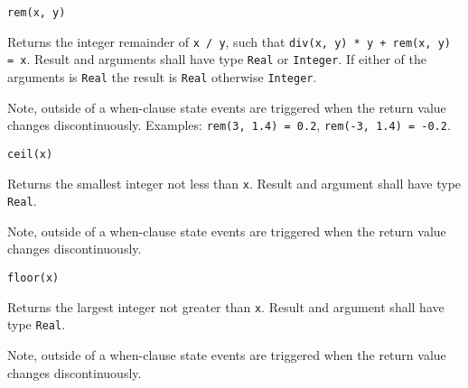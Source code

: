 \begin{operatordefinition}[rem]
\begin{synopsis}\begin{lstlisting}
rem(x, y)
\end{lstlisting}\end{synopsis}
\begin{semantics}
Returns the integer remainder of \lstinline!x / y!, such that \lstinline!div(x, y) * y + rem(x, y) = x!.  Result and arguments shall have type \lstinline!Real! or \lstinline!Integer!.  If either of the arguments is \lstinline!Real! the result is \lstinline!Real! otherwise \lstinline!Integer!.
\begin{nonnormative}
Note, outside of a when-clause state events are triggered when the return value changes discontinuously.  Examples: \lstinline!rem(3, 1.4) = 0.2!, \lstinline!rem(-3, 1.4) = -0.2!.
\end{nonnormative}
\end{semantics}
\end{operatordefinition}

\begin{operatordefinition}[ceil]
\begin{synopsis}\begin{lstlisting}
ceil(x)
\end{lstlisting}\end{synopsis}
\begin{semantics}
Returns the smallest integer not less than \lstinline!x!.  Result and argument shall have type \lstinline!Real!.
\begin{nonnormative}
Note, outside of a when-clause state events are triggered when the return value changes discontinuously.
\end{nonnormative}
\end{semantics}
\end{operatordefinition}

\begin{operatordefinition}[floor]
\begin{synopsis}\begin{lstlisting}
floor(x)
\end{lstlisting}\end{synopsis}
\begin{semantics}
Returns the largest integer not greater than \lstinline!x!.  Result and argument shall have type \lstinline!Real!.
\begin{nonnormative}
Note, outside of a when-clause state events are triggered when the return value changes discontinuously.
\end{nonnormative}
\end{semantics}
\end{operatordefinition}


